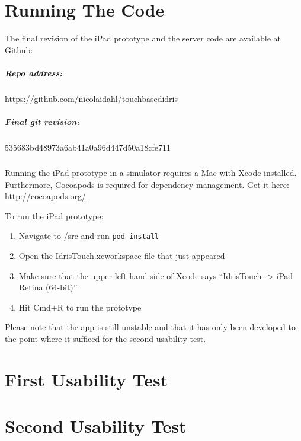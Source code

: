 \appendix
\label{Appendix}
\chapter{Running The Code}
\label{chap:RunningTheCode}
The final revision of the iPad prototype and the server code are available at
Github: 
\paragraph{Repo address:} \url{https://github.com/nicolaidahl/touchbasedidris}
\paragraph{Final git revision:} 535683bd48973a6ab41a0a96d447d50a18cfe711
\paragraph{}
Running the iPad prototype in a simulator requires a Mac with Xcode installed. Furthermore,
Cocoapods is required for dependency management. Get it here: \url{http://cocoapods.org/}

To run the iPad prototype: 
\begin{enumerate}
	\item Navigate to /src and run \texttt{pod install}
	\item Open the IdrisTouch.xcworkspace file that just appeared
	\item Make sure that the upper left-hand side of Xcode says ``IdrisTouch -> iPad
	Retina (64-bit)''
	\item Hit Cmd+R to run the prototype
\end{enumerate}

Please note that the app is still unstable and that it has only been developed
to the point where it sufficed for the second usability test.

\chapter{First Usability Test}
\label{chap:FirstUsabilityTest}


\chapter{Second Usability Test}
\label{chap:SecondUsabilityTest}


